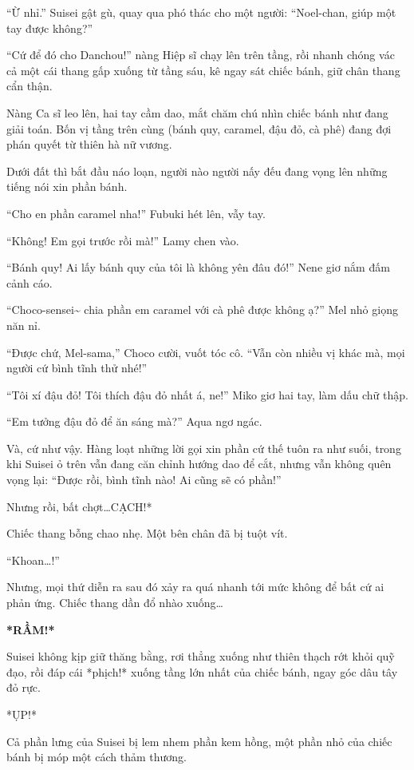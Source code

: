 \documentclass[../main.tex]{subfiles}
\begin{document}
``Ừ nhỉ.'' Suisei gật gù, quay qua phó thác cho một người: ``Noel-chan, giúp một tay được không?''

``Cứ để đó cho Danchou!'' nàng Hiệp sĩ chạy lên trên tầng, rồi nhanh chóng vác cả một cái thang gấp xuống từ tầng sáu, kê ngay sát chiếc bánh, giữ chân thang cẩn thận.

Nàng Ca sĩ leo lên, hai tay cầm dao, mắt chăm chú nhìn chiếc bánh như đang giải toán. Bốn vị tầng trên cùng (bánh quy, caramel, đậu đỏ, cà phê) đang đợi phán quyết từ thiên hà nữ vương.

Dưới đất thì bắt đầu náo loạn, người nào người nấy đếu đang vọng lên những tiếng nói xin phần bánh.

``Cho en phần caramel nha!'' Fubuki hét lên, vẫy tay.

``Không! Em gọi trước rồi mà!'' Lamy chen vào.

``Bánh quy! Ai lấy bánh quy của tôi là không yên đâu đó!'' Nene giơ nắm đấm cảnh cáo.

``Choco-sensei\~{} chia phần em caramel với cà phê được không ạ?'' Mel nhỏ giọng năn nỉ.

``Được chứ, Mel-sama,'' Choco cười, vuốt tóc cô. ``Vẫn còn nhiều vị khác mà, mọi người cứ bình tĩnh thử nhé!''

``Tôi xí đậu đỏ! Tôi thích đậu đỏ nhất á, ne!'' Miko giơ hai tay, làm dấu chữ thập.

``Em tưởng đậu đỏ để ăn sáng mà?'' Aqua ngơ ngác.

Và, cứ như vậy. Hàng loạt những lời gọi xin phần cứ thế tuôn ra như suối, trong khi Suisei ỏ trên vẫn đang căn chỉnh hướng dao để cắt, nhưng vẫn không quên vọng lại: ``Được rồi, bình tĩnh nào! Ai cũng sẽ có phần!''

Nhưng rồi, bất chợt\dots *CẠCH!*

Chiếc thang bỗng chao nhẹ. Một bên chân đã bị tuột vít.

``Khoan\dots!''

Nhưng, mọi thứ diễn ra sau đó xảy ra quá nhanh tới mức không để bất cứ ai phản ứng. Chiếc thang dần đổ nhào xuống\dots

\textbf{*RẦM!*}

Suisei không kịp giữ thăng bằng, rơi thẳng xuống như thiên thạch rớt khỏi quỹ đạo, rồi đáp cái *phịch!* xuống tầng lớn nhất của chiếc bánh, ngay góc dâu tây đỏ rực.

*ỤP!*

Cả phần lưng của Suisei bị lem nhem phần kem hồng, một phần nhỏ của chiếc bánh bị móp một cách thảm thương.
\end{document}
